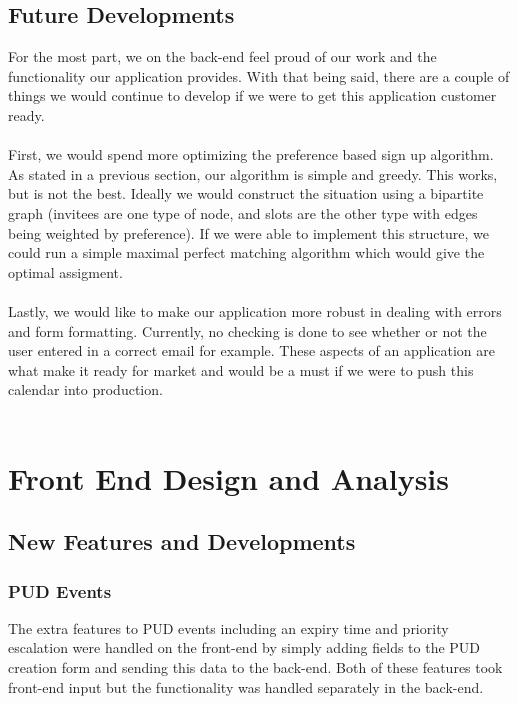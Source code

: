 \documentclass[11pt]{article}   %
\begin{document}
\subsection{Future Developments}
For the most part, we on the back-end feel proud of our work and the functionality our application provides. With that being said, there are a couple of things we would continue to develop if we were to get this application customer ready.\\~\\
First, we would spend more optimizing the preference based sign up algorithm. As stated in a previous section, our algorithm is simple and greedy. This works, but is not the best. Ideally we would construct the situation using a bipartite graph (invitees are one type of node, and slots are the other type with edges being weighted by preference). If we were able to implement this structure, we could run a simple maximal perfect matching algorithm which would give the optimal assigment.\\~\\
Lastly, we would like to make our application more robust in dealing with errors and form formatting. Currently, no checking is done to see whether or not the user entered in a correct email for example. These aspects of an application are what make it ready for market and would be a must if we were to push this calendar into production.\\~\\

\section{Front End Design and Analysis}

\subsection{New Features and Developments}

\subsubsection{PUD Events}

The extra features to PUD events including an expiry time and priority escalation were handled on the front-end by simply adding fields to the PUD creation form and sending this data to the back-end. Both of these features  took front-end input but the functionality was handled separately in the back-end.
\end{document}
